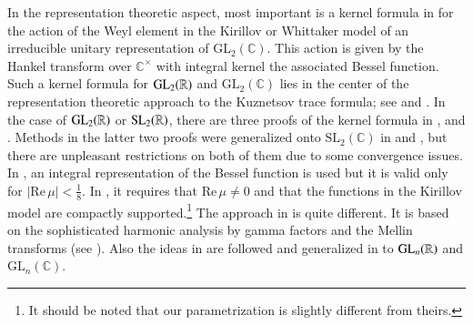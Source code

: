 \documentclass{amsproc}
\newcommand{\BC}{{\mathbb {C}}} \newcommand{\BD}{{\mathbb {D}}}
\newcommand{\GL}{{\mathrm {GL}}} \newcommand{\PGL}{{\mathrm {PGL}}}
\newcommand{\SL}{{\mathrm {SL}}} \newcommand{\PSL}{{\mathrm {PSL}}}
\def\BCx{\BC^{\times}}
\renewcommand{\Re}{{\mathrm{Re}\,}}
\theoremstyle{plain}
\numberwithin{equation}{section}
\begin{document}
	In the representation theoretic aspect, most important is a kernel formula in \cite[\S 18]{Qi-Bessel} for the action of the Weyl element in the Kirillov or Whittaker model of an irreducible unitary representation of $\GL_2 (\BC)$. This action is given by the Hankel transform over $\BCx$ with integral kernel the associated Bessel function. Such a kernel formula for $\GL_2 (\BR)$ and $\GL_2 (\BC)$ lies in the center of the representation theoretic approach to the Kuznetsov trace formula; see \cite{CPS} and \cite{Qi-Kuz}. In the case of $\GL_2 (\BR)$ or $\SL_2 (\BR)$, there are three proofs of the kernel formula in \cite[\S 8]{CPS},  \cite{Mo-Kernel} and \cite[Appendix 2]{BaruchMao-Real}. Methods in the latter two proofs were generalized onto  $\SL_2 (\BC)$ in  \cite{B-Mo-Kernel2,Mo-Kernel2} and \cite{Baruch-Kernel}, but there are  unpleasant restrictions on both of them  due to some  convergence issues. In \cite{B-Mo-Kernel2}, an integral representation of the Bessel function is used but it is valid only for  $ |\Re \mu | < \frac 1 8$. In \cite{Baruch-Kernel}, it requires that $\Re \mu  \neq 0$ and that the functions in the Kirillov model are compactly supported.\footnote{It should be noted that our parametrization is slightly different from theirs.} The approach in \cite{Qi-Bessel} is quite different. It is based on  the  sophisticated harmonic analysis by gamma factors and the Mellin transforms (see \cite[\S 1-3]{Qi-Bessel}). Also the ideas in  \cite[\S 8]{CPS} are followed and generalized  in \cite[\S 17]{Qi-Bessel} to $\GL_n (\BR)$ and $\GL_n (\BC)$.
	
\end{document}
